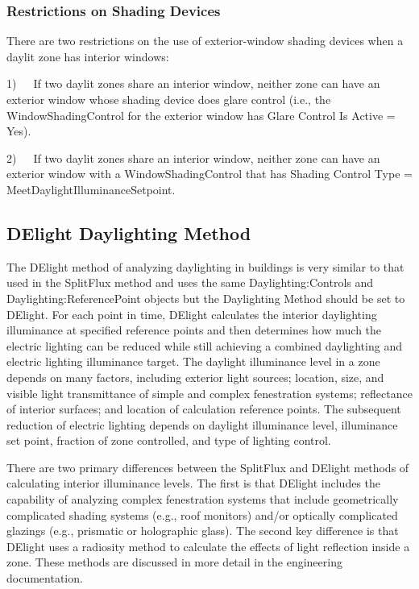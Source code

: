 \subsubsection{Restrictions on Shading Devices}\label{restrictions-on-shading-devices}

There are two restrictions on the use of exterior-window shading devices when a daylit zone has interior windows:

1)~~~If two daylit zones share an interior window, neither zone can have an exterior window whose shading device does glare control (i.e., the WindowShadingControl for the exterior window has Glare Control Is Active = Yes).

2)~~~If two daylit zones share an interior window, neither zone can have an exterior window with a WindowShadingControl that has Shading Control Type = MeetDaylightIlluminanceSetpoint.

\subsection{DElight Daylighting Method}\label{delight-daylighting-method}

The DElight method of analyzing daylighting in buildings is very similar to that used in the SplitFlux method and uses the same Daylighting:Controls and Daylighting:ReferencePoint objects but the Daylighting Method should be set to DElight. For each point in time, DElight calculates the interior daylighting illuminance at specified reference points and then determines how much the electric lighting can be reduced while still achieving a combined daylighting and electric lighting illuminance target. The daylight illuminance level in a zone depends on many factors, including exterior light sources; location, size, and visible light transmittance of simple and complex fenestration systems; reflectance of interior surfaces; and location of calculation reference points. The subsequent reduction of electric lighting depends on daylight illuminance level, illuminance set point, fraction of zone controlled, and type of lighting control.

There are two primary differences between the SplitFlux and DElight methods of calculating interior illuminance levels. The first is that DElight includes the capability of analyzing complex fenestration systems that include geometrically complicated shading systems (e.g., roof monitors) and/or optically complicated glazings (e.g., prismatic or holographic glass). The second key difference is that DElight uses a radiosity method to calculate the effects of light reflection inside a zone. These methods are discussed in more detail in the engineering documentation.

